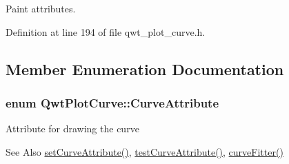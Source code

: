 Paint attributes. 



Definition at line 194 of file qwt\-\_\-plot\-\_\-curve.\-h.



\subsection{Member Enumeration Documentation}
\hypertarget{class_qwt_plot_curve_a38064f7de6f026a49db782c365f872c3}{
\subsubsection[{Curve\-Attribute}]{\setlength{\rightskip}{0pt plus 5cm}enum {\bf Qwt\-Plot\-Curve\-::\-Curve\-Attribute}}}\label{class_qwt_plot_curve_a38064f7de6f026a49db782c365f872c3}
Attribute for drawing the curve \begin{DoxySeeAlso}{See Also}
\hyperlink{class_qwt_plot_curve_a6ac9243e280f96cd149102a91271a473}{set\-Curve\-Attribute()}, \hyperlink{class_qwt_plot_curve_a0dc5e6af9ec33a1b54e3c3041c00b939}{test\-Curve\-Attribute()}, \hyperlink{class_qwt_plot_curve_aaf299522e4ad972996c781aacc940d31}{curve\-Fitter()} 
\end{DoxySeeAlso}
